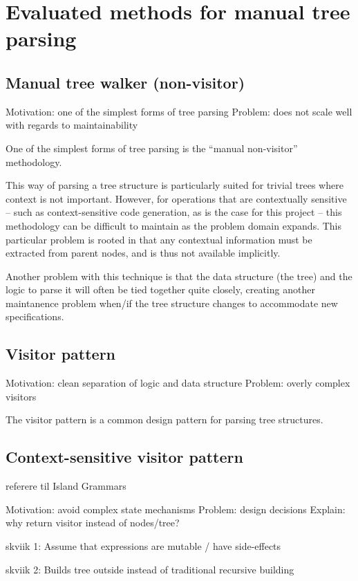 \section{Evaluated methods for manual tree parsing}
\label{sect:method:evaluated_methods}

\subsection{Manual tree walker (non-visitor)}
\label{sect:method:evaluated_methods:manual_walker}
Motivation: one of the simplest forms of tree parsing
Problem: does not scale well with regards to maintainability

One of the simplest forms of tree parsing is the ``manual non-visitor''
methodology.

This way of parsing a tree structure is particularly suited for trivial trees
where context is not important. However, for operations that are contextually 
sensitive -- such as context-sensitive code generation, as is the case for this
project -- this methodology can be difficult to maintain as the problem domain 
expands. This particular problem is rooted in that any contextual information
must be extracted from parent nodes, and is thus not available implicitly.

Another problem with this technique is that the data structure (the tree) and
the logic to parse it will often be tied together quite closely, creating
another maintanence problem when/if the tree structure changes to
accommodate new specifications.

\subsection{Visitor pattern}
\label{sect:method:visitorPattern}
Motivation: clean separation of logic and data structure 
Problem: overly complex visitors

The visitor pattern is a common design pattern for parsing tree structures. 

\subsection{Context-sensitive visitor pattern}
\label{sect:method:contextVisitorPattern}

referere til Island Grammars


Motivation: avoid complex state mechanisms
Problem: design decisions
Explain: why return visitor instead of nodes/tree?

skviik 1: Assume that expressions are mutable / have side-effects

skviik 2: Builds tree outside instead of traditional recursive building